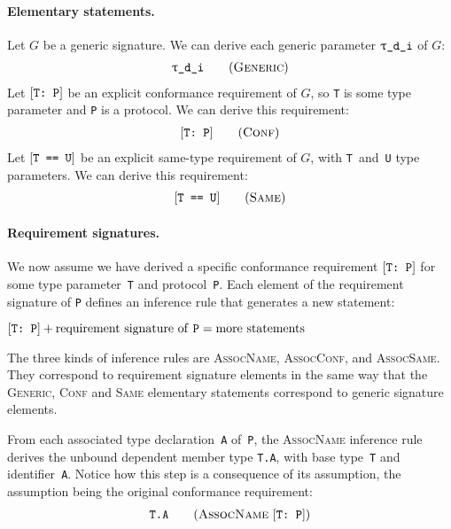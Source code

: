 \documentclass[../generics]{subfiles}
\begin{document}
\paragraph{Elementary statements.}
Let $G$ be a generic signature. We can derive each generic parameter $\texttt{$\uptau$\_d\_i}$ of $G$:
\begin{gather*}
\GenericStepDef
\end{gather*}
Let $[\texttt{T:~P}]$ be an explicit conformance requirement of $G$, so \texttt{T} is some type parameter and \texttt{P} is a protocol. We can derive this requirement:
\begin{gather*}
\ConfStepDef
\end{gather*}
Let $[\texttt{T == U}]$ be an explicit same-type requirement of $G$, with \texttt{T}~and~\texttt{U} type parameters. We can derive this requirement:
\begin{gather*}
\SameStepDef
\end{gather*}

\paragraph{Requirement signatures.}
We now assume we have derived a specific conformance requirement $[\texttt{T:~P}]$ for some type parameter~\texttt{T} and protocol~\texttt{P}. Each element of the requirement signature of \texttt{P} defines an inference rule that generates a new statement:
\begin{center}
$[\texttt{T:~P}] + \text{requirement signature of \texttt{P}} = \text{more statements}$
\end{center}
The three kinds of inference rules are \textsc{AssocName}, \textsc{AssocConf}, and \textsc{AssocSame}. They correspond to requirement signature elements in the same way that the \textsc{Generic}, \textsc{Conf} and \textsc{Same} elementary statements correspond to generic signature elements.

From each associated type declaration~\texttt{A} of~\texttt{P}, the \textsc{AssocName} inference rule derives the unbound dependent member type \texttt{T.A}, with base type~\texttt{T} and identifier~\texttt{A}. Notice how this step is a consequence of its assumption, the assumption being the original conformance requirement:
\begin{gather*}
\AssocNameStepDef
\end{gather*}
\end{document}
